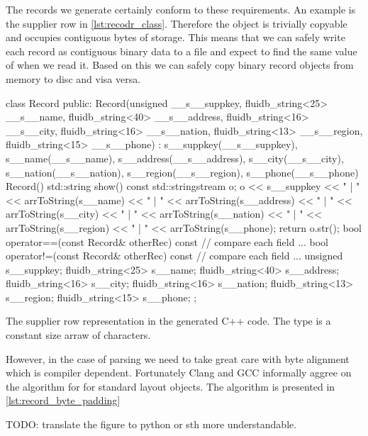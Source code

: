 The records we generate certainly conform to these requirements. An
example is the supplier row in \ref{lst:recodr_class}. Therefore the
object is trivially copyable and occupies contiguous bytes of
storage. This means that we can safely write each record  as
 contiguous binary data to a file and expect to find the
same value of  when we read it. Based on this we can safely copy
binary record objects from memory to disc and visa versa.

\begin{code}
\begin{cppcode}
class Record {
public:
  Record(unsigned __s__suppkey, fluidb_string<25> __s__name,
         fluidb_string<40> __s__address, fluidb_string<16> __s__city,
         fluidb_string<16> __s__nation, fluidb_string<13> __s__region,
         fluidb_string<15> __s__phone)
    : s__suppkey(__s__suppkey),
      s__name(__s__name),
      s__address(__s__address),
      s__city(__s__city),
      s__nation(__s__nation),
      s__region(__s__region),
      s__phone(__s__phone) {}
  Record() {}
  std::string show() const {
    std::stringstream o;
    o << s__suppkey << " | " << arrToString(s__name) << " | "
      << arrToString(s__address) << " | " << arrToString(s__city) << " | "
      << arrToString(s__nation) << " | " << arrToString(s__region) << " | "
      << arrToString(s__phone);
    return o.str();
  }
  bool operator==(const Record& otherRec) const {
    // compare each field ...
  }
  bool operator!=(const Record& otherRec) const {
    // compare each field ...
  }
  unsigned s__suppkey;
  fluidb_string<25> s__name;
  fluidb_string<40> s__address;
  fluidb_string<16> s__city;
  fluidb_string<16> s__nation;
  fluidb_string<13> s__region;
  fluidb_string<15> s__phone;
};
\end{cppcode}
  \caption{\label{lst:recodr_class}The supplier row representation in
    the generated C++ code. The  type is a
    constant size arraw of characters.}
\end{code}

However, in the case of parsing we need to take great care with byte
alignment which is compiler dependent. Fortunately Clang and GCC
informally aggree on the algorithm for  for
standard layout objects. The algorithm is presented in
\ref{lst:record_byte_padding}

TODO: translate the figure to python or sth more understandable.


